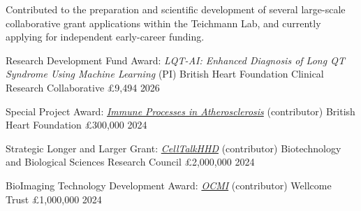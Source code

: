
Contributed to the preparation and scientific development of several large-scale collaborative grant applications within the Teichmann Lab, and currently applying for independent early-career funding.

\begin{cvhonors}

\cvhonor
{Research Development Fund Award: \emph{LQT-AI: Enhanced Diagnosis of Long QT Syndrome Using Machine Learning} (PI)}
{British Heart Foundation Clinical Research Collaborative}
{\pounds9,494}
{2026}

\cvhonor
{Special Project Award: \href{https://www.bhf.org.uk/-/media/files/for-professionals/r13137_research_report_2024_final_rgbpdf.pdf?rev=d886c07c01384eed9d41c684afa272e9&hash=1C86C18E7ABDBDD75131C81D78DBBA35}{\emph{Immune Processes in Atherosclerosis}} (contributor)}
{British Heart Foundation}
{\pounds300,000}
{2024}

\cvhonor
{Strategic Longer and Larger Grant: \href{https://www.stemcells.cam.ac.uk/news/sinha-lab-receive-one-four-new-bbsrc-slola-grants}{\emph{CellTalkHHD}} (contributor)}
{Biotechnology and Biological Sciences Research Council}
{\pounds2,000,000}
{2024}

\cvhonor
{BioImaging Technology Development Award: \href{https://wellcome.org/research-funding/funding-portfolio/funded-grants/organ-cell-molecular-imaging-ocmi-integrating}{\emph{OCMI}} (contributor)}
{Wellcome Trust}
{\pounds1,000,000}
{2024}

\end{cvhonors}

